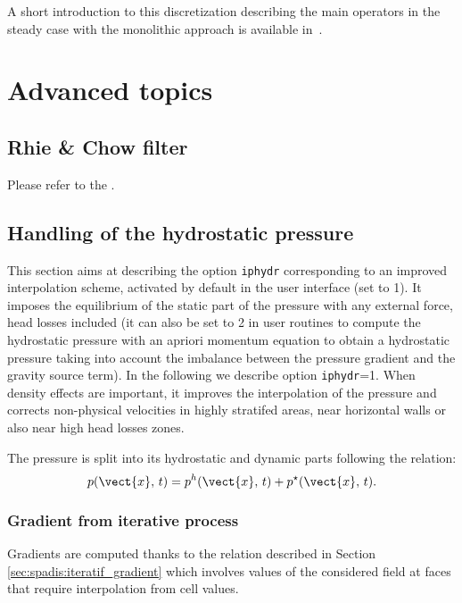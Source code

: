 A short introduction to this discretization describing the main operators in
the steady case with the monolithic approach is available in~\cite{BoErM20}.

\section{Advanced topics}

\subsection{Rhie \& Chow filter}

\hypertarget{arak}{}

Please refer to the .

\subsection{Handling of the hydrostatic pressure}
\label{sec:spadis:iphydr}

This section aims at describing the option \texttt{iphydr} corresponding to an
improved interpolation scheme, activated by default in the user interface (set
to 1). It imposes the equilibrium of the static part of the pressure with any
external force, head losses included (it can also be set to 2 in user routines
to compute the hydrostatic pressure with an apriori momentum equation to obtain
a hydrostatic pressure taking into account the imbalance between the pressure
gradient and the gravity source term). In the following we describe option
\texttt{iphydr}=1. When density effects are important, it improves the
interpolation of the pressure and corrects non-physical velocities in highly
stratifed areas, near horizontal walls or also near high head losses zones.

The pressure is split into its hydrostatic and dynamic parts following the
relation:
\begin{equation}
	\label{eqn:ph}
    p(\vect{x}, \, t ) = p^h(\vect{x}, \, t) + p^\star(\vect{x}, \, t).
\end{equation}

\subsubsection{Gradient from iterative process} Gradients are computed thanks
to the relation described in Section \ref{sec:spadis:iteratif_gradient} which
involves values of the considered field at faces that require interpolation
from cell values.

